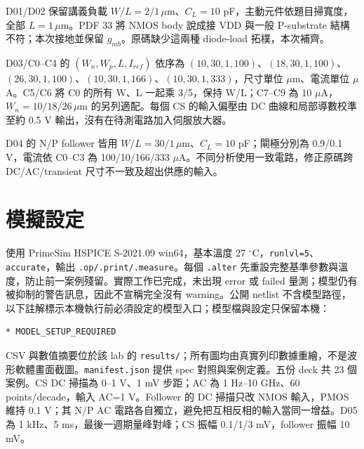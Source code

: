 D01/D02 保留講義負載 $W/L=2/1\,\mu$m、$C_L=10$ pF，主動元件依題目掃寬度，全部 $L=1\,\mu$m。PDF 33 將 NMOS body 說成接 VDD 與一般 P-substrate 結構不符；本次接地並保留 $g_{mb}$。原碼缺少這兩種 diode-load 拓樸，本次補齊。

D03/C0--C4 的 $(W_n,W_p,L,I_{ref})$ 依序為 $(10,30,1,100)$、$(18,30,1,100)$、$(26,30,1,100)$、$(10,30,1,166)$、$(10,30,1,333)$，尺寸單位 $\mu$m、電流單位 $\mu$A。C5/C6 將 C0 的所有 W、L 一起乘 3/5，保持 W/L；C7--C9 為 10 $\mu$A，$W_n=10/18/26\,\mu$m 的另列適配。每個 CS 的輸入偏壓由 DC 曲線和局部導數校準至約 0.5 V 輸出，沒有在待測電路加入伺服放大器。

D04 的 N/P follower 皆用 $W/L=30/1\,\mu$m、$C_L=10$ pF；閘極分別為 0.9/0.1 V，電流依 C0--C3 為 100/10/166/333 $\mu$A。不同分析使用一致電路，修正原碼跨 DC/AC/transient 尺寸不一致及超出供應的輸入。

\section{模擬設定}
使用 PrimeSim HSPICE S-2021.09 win64，基本溫度 27 $^\circ$C，\texttt{runlvl=5}、\texttt{accurate}，輸出 \texttt{.op/.print/.measure}。每個 \texttt{.alter} 先重設完整基準參數與溫度，防止前一案例殘留。實際工作已完成，未出現 error 或 failed 量測；模型仍有被抑制的警告訊息，因此不宣稱完全沒有 warning。公開 netlist 不含模型路徑，以下註解標示本機執行前必須設定的模型入口；模型檔與設定只保留本機：
\begin{verbatim}
* MODEL_SETUP_REQUIRED
\end{verbatim}
CSV 與數值摘要位於該 lab 的 \texttt{results/}；所有圖均由真實列印數據重繪，不是波形軟體畫面截圖。\texttt{manifest.json} 提供 spec 對照與案例定義。五份 deck 共 23 個案例。CS DC 掃描為 0--1 V、1 mV 步距；AC 為 1 Hz--10 GHz、60 points/decade，輸入 AC=1 V。Follower 的 DC 掃描只改 NMOS 輸入，PMOS 維持 0.1 V；其 N/P AC 電路各自獨立，避免把互相反相的輸入當同一增益。D05 為 1 kHz、5 ms，最後一週期量峰對峰；CS 振幅 0.1/1/3 mV，follower 振幅 10 mV。

